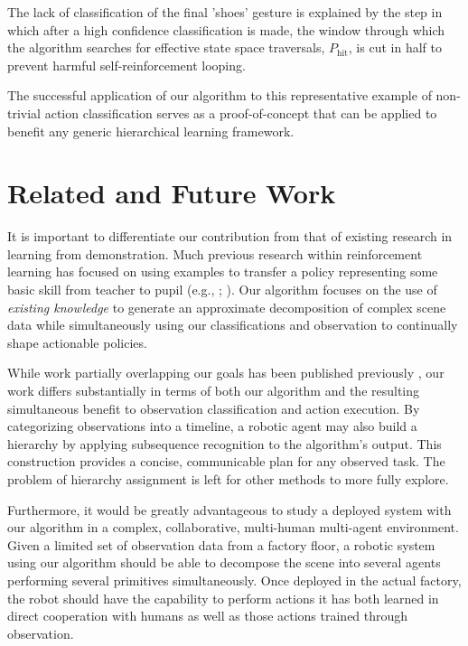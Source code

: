 \documentclass[letterpaper]{article}
\begin{document}
The lack of classification of the final 'shoes' gesture is explained by the step in which after a high confidence classification is made, the window through which the algorithm searches for effective state space traversals, $P_{\mathrm{hit}}$, is cut in half to prevent harmful self-reinforcement looping.

The successful application of our algorithm to this representative example of non-trivial action classification serves as a proof-of-concept that can be applied to benefit any generic hierarchical learning framework.


\section{Related and Future Work}
\label{sec:future}
It is important to differentiate our contribution from that of
existing research in learning from demonstration.  Much previous research
within reinforcement learning has focused on using examples to
transfer a policy representing some basic skill from teacher to
pupil (e.g., \citeauthor{JenkinsLFD} \citeyear{JenkinsLFD}; \citeauthor{LFDSurvey} \citeyear{LFDSurvey}).  Our algorithm focuses on the use of
\textit{existing knowledge} to generate an approximate decomposition of
complex scene data while simultaneously using our classifications and 
observation to continually shape actionable policies.

While work partially overlapping our goals has been published previously
\cite{LearningBehaviorFusion}, our work differs substantially in terms of both
our algorithm and the resulting simultaneous benefit to observation
classification and action execution. By categorizing observations into a timeline, a robotic agent may also build a hierarchy by applying subsequence recognition to the algorithm's output. This construction provides a concise, communicable plan for any observed task. The problem of hierarchy assignment is left for other methods to more fully explore.

Furthermore, it would be greatly advantageous to study a deployed system with our algorithm in a complex, collaborative, multi-human multi-agent environment. Given a limited set of observation data from a factory floor, a robotic system using our algorithm should be able to decompose the scene into several agents performing several primitives simultaneously.  Once deployed in the actual factory, the robot should have the capability to perform actions it has both learned in direct cooperation with humans as well as those actions trained through observation. 
\end{document}
